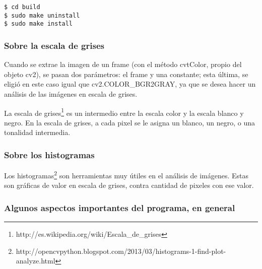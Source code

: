 \documentclass[letter]{article}
\begin{document}
\begin{lstlisting}
$ cd build
$ sudo make uninstall
$ sudo make install
\end{lstlisting}

\subsubsection{Sobre la escala de grises}

Cuando se extrae la imagen de un frame (con el método cvtColor, propio del objeto cv2), se pasan dos parámetros: el frame y una constante; esta última, se eligió en este caso igual que cv2.COLOR\_BGR2GRAY, ya que se desea hacer un análisis de las imágenes en escala de grises.

La escala de grises\footnote{http://es.wikipedia.org/wiki/Escala\_de\_grises} es un intermedio entre la escala color y la escala blanco y negro. En la escala de grises, a cada pixel se le asigna un blanco, un negro, o una tonalidad intermedia.

\subsubsection{Sobre los histogramas}

Los histogramas\footnote{http://opencvpython.blogspot.com/2013/03/histograms-1-find-plot-analyze.html} son herramientas muy útiles en el análisis de imágenes. Estas son gráficas de valor en escala de grises, contra cantidad de pixeles con ese valor.

\subsubsection{Algunos aspectos importantes del programa, en general}
\end{document}
